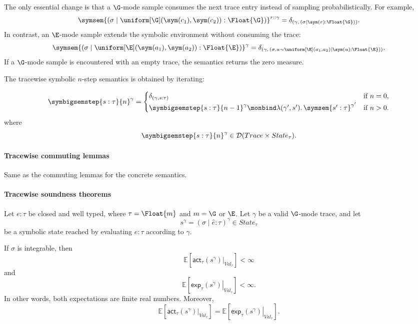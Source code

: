 The only essential change is that a $\G$-mode sample consumes the next trace
entry instead of sampling probabilistically. For example,
\[
\symsem{
  (\sigma\mid
    \uniform[\G](\sym(c_1),\sym(c_2)):\Float{\G})
}^{r::\gamma}
=
\delta_{
  \left(
    \gamma,\,
    (\sigma\mid\sym(r):\Float{\G})
  \right)
}.
\]In contrast, an $\E$-mode sample extends the symbolic environment without
consuming the trace:
\[
\symsem{
  (\sigma\mid
    \uniform[\E](\sym(a_1),\sym(a_2)):\Float{\E})
}^{\gamma}
=
\delta_{
  \left(
    \gamma,\,
    (\sigma,u\sim\uniform[\E](a_1,a_2)
      \mid\sym(u):\Float{\E})
  \right)
}.
\]If a $\G$-mode sample is encountered with an empty trace, the semantics
returns the zero measure.

The tracewise symbolic $n$-step semantics is obtained by iterating:

\begin{align*}
  \symbigsemstep{s:\tau}{n}^{\gamma}
  =
  \begin{cases}
    \delta_{(\gamma,s:\tau)}
      & \text{if } n=0, \\[2pt]
    \symbigsemstep{s:\tau}{n-1}^{\gamma}
    \monbind
    \lambda(\gamma',s').\,
    \symsem{s':\tau}^{\gamma'}
      & \text{if } n>0.
  \end{cases}
\end{align*}
where
\[
  \symbigsemstep{s:\tau}{n}^{\gamma}
  \in
  \mathcal D(Trace\times State_\tau).
\]

\paragraph{Tracewise commuting lemmas} Same as the commuting lemmas for the concrete semantics.


\paragraph{Tracewise soundness theorems}
\begin{theorem}
  \label{thm:tracewise-agreement-of-interpretations}
  Let $e:\tau$ be closed and well typed, where
  $\tau=\Float{m}$ and $m=\G$ or $\E$. Let $\gamma$ be a valid $\G$-mode trace, and let 
  \[
    s^\gamma
    =
    (\sigma\mid\hat e:\tau)^\gamma
    \in State_\tau
  \]
  be a symbolic state reached by evaluating $e : \tau$ according to $\gamma$.

  If $\sigma$ is integrable, then
  \[
    \mathbb E\!\left[
        \left.\mathsf{act}_\tau(s^\gamma)\right|_{Val_\tau}
    \right]
    <
    \infty
  \]
  and
  \[
    \mathbb E\!\left[
        \left.\mathsf{exp}_\tau(s^\gamma)\right|_{Val_\tau}
    \right]
    <
    \infty.
  \]
  In other words, both expectations are finite real numbers. Moreover,
  \[
    \mathbb E\!\left[
      \left.\mathsf{act}_\tau(s^\gamma)\right|_{Val_\tau}
    \right]
    =
    \mathbb E\!\left[
      \left.\mathsf{exp}_\tau(s^\gamma)\right|_{Val_\tau}
    \right].
  \]
\end{theorem}

